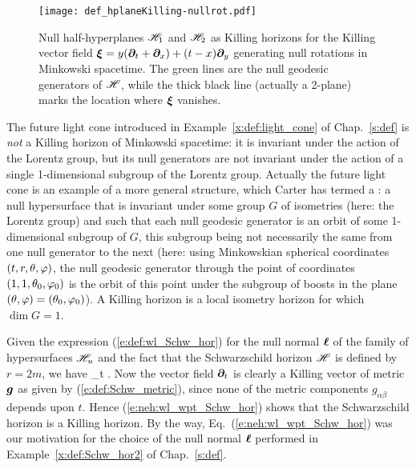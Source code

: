 \begin{figure}
\centerline{\texttt{[image: def\_hplaneKilling-nullrot.pdf]}}
\caption[]{\label{f:neh:hplaneKilling-nullrot} \footnotesize
Null half-hyperplanes $\mathscr{H}_1$ and $\mathscr{H}_2$ as Killing horizons for the
Killing vector field $\bm{\xi}=y( \bm{\partial}_t + \bm{\partial}_x ) + (t-x)\bm{\partial}_y$
generating null rotations
in Minkowski spacetime. The green lines are the null geodesic generators of
$\mathscr{H}$, while the thick black line (actually a 2-plane) marks the location
where $\bm{\xi}$ vanishes.}
\end{figure}

\begin{example}
The future light cone introduced in Example~\ref{x:def:light_cone} of Chap.~\ref{s:def} is \emph{not} a
Killing horizon of Minkowski spacetime: it is invariant under the action
of the Lorentz group, but its null generators are not invariant
under the action of a single 1-dimensional subgroup of the Lorentz group.
Actually the future light cone is an example of a more general structure,
which Carter has termed a
 \cite{Carte67,Carte69}: a null hypersurface that is invariant under
some group $G$ of isometries (here: the Lorentz group) and such that each null
geodesic generator is an orbit of some 1-dimensional subgroup of $G$,
this subgroup being not necessarily the same from one null generator to the next
(here: using Minkowskian spherical
coordinates $(t,r,\theta,\varphi)$,
the null geodesic generator through the point of coordinates $(1,1,\theta_0,\varphi_0)$
is the orbit of this point under the subgroup of boosts in the plane
$(\theta,\varphi) = (\theta_0,\varphi_0)$). A Killing horizon is a local isometry horizon
for which $\dim G = 1$.
\end{example}


\begin{example} \label{x:neh:Schwarz_KH}
Given the expression (\ref{e:def:wl_Schw_hor}) for the null normal $\bm{\ell}$
of the family of hypersurfaces $\mathscr{H}_u$ and the fact that the Schwarzschild
horizon $\mathscr{H}$ is defined by $r=2m$, we have
\be \label{e:neh:wl_wpt_Schw_hor}
    \wl \equalH \wpar_t .
\ee
Now the vector field $\bm{\partial}_t$ is clearly a Killing vector of metric $\bm{g}$
as given by (\ref{e:def:Schw_metric}), since none of the metric components
$g_{\alpha\beta}$ depends upon $t$. Hence (\ref{e:neh:wl_wpt_Schw_hor})
shows that the Schwarzschild horizon is a Killing horizon. By the way,
Eq.~(\ref{e:neh:wl_wpt_Schw_hor}) was our motivation for the choice of the
null normal $\bm{\ell}$ performed in Example~\ref{x:def:Schw_hor2} of Chap.~\ref{s:def}.
\end{example}

